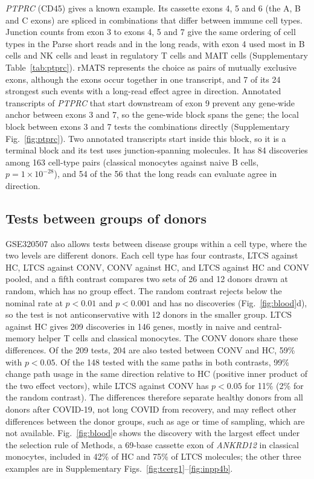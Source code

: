 \documentclass[11pt]{article}
\begin{document}
\emph{PTPRC} (CD45) gives a known example. Its cassette exons 4, 5 and 6 (the A, B and C exons) are spliced in combinations that differ between immune cell types. Junction counts from exon 3 to exons 4, 5 and 7 give the same ordering of cell types in the Parse short reads and in the long reads, with exon 4 used most in B cells and NK cells and least in regulatory T cells and MAIT cells (Supplementary Table~\ref{tab:ptprc}). rMATS represents the choice as pairs of mutually exclusive exons, although the exons occur together in one transcript, and 7 of its 24 strongest such events with a long-read effect agree in direction. Annotated transcripts of \emph{PTPRC} that start downstream of exon 9 prevent any gene-wide anchor between exons 3 and 7, so the gene-wide block spans the gene; the local block between exons 3 and 7 tests the combinations directly (Supplementary Fig.~\ref{fig:ptprc}). Two annotated transcripts start inside this block, so it is a terminal block and its test uses junction-spanning molecules. It has 84 discoveries among 163 cell-type pairs (classical monocytes against naive B cells, $p=1\times10^{-28}$), and 54 of the 56 that the long reads can evaluate agree in direction.

\subsection{Tests between groups of donors}

GSE320507 also allows tests between disease groups within a cell type, where the two levels are different donors. Each cell type has four contrasts, LTCS against HC, LTCS against CONV, CONV against HC, and LTCS against HC and CONV pooled, and a fifth contrast compares two sets of 26 and 12 donors drawn at random, which has no group effect. The random contrast rejects below the nominal rate at $p<0.01$ and $p<0.001$ and has no discoveries (Fig.~\ref{fig:blood}d), so the test is not anticonservative with 12 donors in the smaller group. LTCS against HC gives 209 discoveries in 146 genes, mostly in naive and central-memory helper T cells and classical monocytes. The CONV donors share these differences. Of the 209 tests, 204 are also tested between CONV and HC, 59\% with $p<0.05$. Of the 148 tested with the same paths in both contrasts, 99\% change path usage in the same direction relative to HC (positive inner product of the two effect vectors), while LTCS against CONV has $p<0.05$ for 11\% (2\% for the random contrast). The differences therefore separate healthy donors from all donors after COVID-19, not long COVID from recovery, and may reflect other differences between the donor groups, such as age or time of sampling, which are not available. Fig.~\ref{fig:blood}e shows the discovery with the largest effect under the selection rule of Methods, a 69-base cassette exon of \emph{ANKRD12} in classical monocytes, included in 42\% of HC and 75\% of LTCS molecules; the other three examples are in Supplementary Figs.~\ref{fig:tcerg1}--\ref{fig:inpp4b}.
\end{document}
